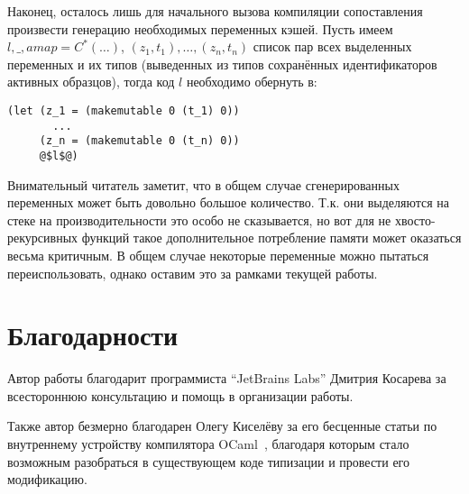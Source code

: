 Наконец, осталось лишь для начального вызова компиляции сопоставления произвести генерацию необходимых переменных кэшей. Пусть имеем $l,\_,amap=C^*(\ldots)$, $(z_1, t_1),\ldots,(z_n, t_n)$ список пар всех выделенных переменных и их типов (выведенных из типов сохранённых идентификаторов активных образцов), тогда код $l$ необходимо обернуть в:

\noindent
\begin{minipage}{\linewidth}
\begin{lstlisting}[language=lambda,escapechar=@] 
(let (z_1 = (makemutable 0 (t_1) 0))
       ...
     (z_n = (makemutable 0 (t_n) 0))
     @$l$@)
\end{lstlisting}
\end{minipage}

Внимательный читатель заметит, что в общем случае сгенерированных переменных может быть довольно большое количество. Т.к. они выделяются на стеке на производительности это особо не сказывается, но вот для не хвосто-рекурсивных функций такое дополнительное потребление памяти может оказаться весьма критичным. В общем случае некоторые переменные можно пытаться переиспользовать, однако оставим это за рамками текущей работы.

\section{Благодарности}

Автор работы благодарит программиста ``JetBrains Labs'' Дмитрия \mbox{Косарева} за всестороннюю консультацию и помощь в организации работы.

Также автор безмерно благодарен Олегу Киселёву за его бесценные статьи по внутреннему устройству компилятора OCaml~\cite{okmij_typechecker}, благодаря которым стало возможным разобраться в существующем коде типизации и провести его модификацию.


\renewcommand\refname{Список литературы}
%

